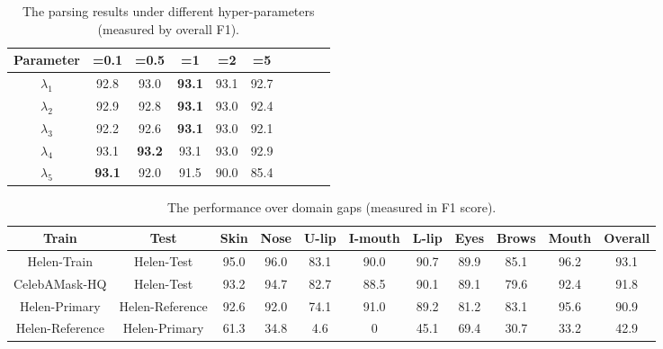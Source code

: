 \begin{table}[t]
\centering
\caption{The parsing results under different hyper-parameters (measured by overall F1).}
\label{table:hyper}
\begin{tabular}{c|cccccccc|c}
\toprule
Parameter & =0.1 & =0.5 & =1 & =2 & =5 \\ 
\midrule

$\lambda_1$ & 92.8 & 93.0 & \textbf{93.1} & 93.1 & 92.7 \\
$\lambda_2$ & 92.9 & 92.8 & \textbf{93.1} & 93.0 & 92.4 \\
$\lambda_3$ & 92.2 & 92.6 & \textbf{93.1} & 93.0 & 92.1 \\
$\lambda_4$ & 93.1 & \textbf{93.2} & 93.1 & 93.0 & 92.9 \\
$\lambda_5$ & \textbf{93.1} & 92.0 & 91.5 & 90.0 & 85.4 \\
\bottomrule
\end{tabular}
\end{table}





\begin{table*}[t]
\centering
\caption{The performance over domain gaps (measured in F1 score).}
\label{table:cross}
\begin{tabular}{c|c|cccccccc|c}
\toprule
Train & Test & Skin & Nose & U-lip & I-mouth & L-lip & Eyes & Brows & Mouth & Overall \\ 
\midrule

Helen-Train & Helen-Test & 95.0 & 96.0 & 83.1 & 90.0 & 90.7 & 89.9 & 85.1 & 96.2 & 93.1 \\
\midrule
CelebAMask-HQ & Helen-Test  & 93.2 & 94.7 & 82.7 & 88.5 & 90.1 & 89.1 & 79.6 & 92.4 & 91.8  \\
\midrule
Helen-Primary & Helen-Reference & 92.6 & 92.0 & 74.1 & 91.0 & 89.2 & 81.2 & 83.1 & 95.6 & 90.9  \\
Helen-Reference & Helen-Primary & 61.3 & 34.8 & 4.6 & 0 & 45.1 & 69.4 & 30.7 & 33.2 & 42.9  \\
\bottomrule
\end{tabular}
\end{table*}

